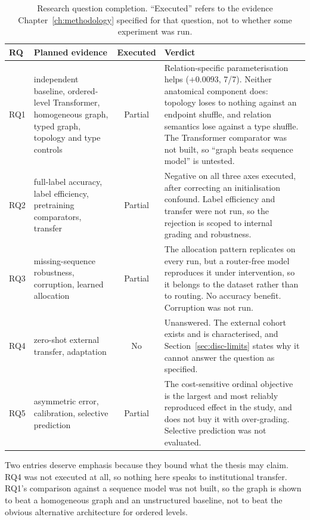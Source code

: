 \documentclass[12pt,a4paper]{report}
\begin{document}
\begin{table}[htbp]
  \centering\small
  \caption{Research question completion. \enquote{Executed} refers to the
  evidence Chapter~\ref{ch:methodology} specified for that question, not to
  whether some experiment was run.}
  \label{tab:rqmatrix}
  \begin{tabular}{@{}lp{4.3cm}cp{5.0cm}@{}}
    \toprule
    RQ & Planned evidence & Executed & Verdict \\
    \midrule
    RQ1 & independent baseline, ordered-level Transformer, homogeneous graph,
    typed graph, topology and type controls & Partial &
    Relation-specific parameterisation helps ($+0.0093$, 7/7). Neither
    anatomical component does: topology loses to nothing against an endpoint
    shuffle, and relation semantics lose against a type shuffle. The
    Transformer comparator was not built, so \enquote{graph beats sequence
    model} is untested. \\
    \addlinespace
    RQ2 & full-label accuracy, label efficiency, pretraining comparators,
    transfer & Partial &
    Negative on all three axes executed, after correcting an initialisation
    confound. Label efficiency and transfer were not run, so the rejection is
    scoped to internal grading and robustness. \\
    \addlinespace
    RQ3 & missing-sequence robustness, corruption, learned allocation &
    Partial &
    The allocation pattern replicates on every run, but a router-free model
    reproduces it under intervention, so it belongs to the dataset rather than
    to routing. No accuracy benefit. Corruption was not run. \\
    \addlinespace
    RQ4 & zero-shot external transfer, adaptation & No &
    Unanswered. The external cohort exists and is characterised, and
    Section~\ref{sec:disc-limits} states why it cannot answer the question
    as specified. \\
    \addlinespace
    RQ5 & asymmetric error, calibration, selective prediction & Partial &
    The cost-sensitive ordinal objective is the largest and most reliably
    reproduced effect in the study, and does not buy it with over-grading.
    Selective prediction was not evaluated. \\
    \bottomrule
  \end{tabular}
\end{table}

Two entries deserve emphasis because they bound what the thesis may claim. RQ4
was not executed at all, so nothing here speaks to institutional transfer. RQ1's
comparison against a sequence model was not built, so the graph is shown to
beat a homogeneous graph and an unstructured baseline, not to beat the obvious
alternative architecture for ordered levels.
\end{document}
